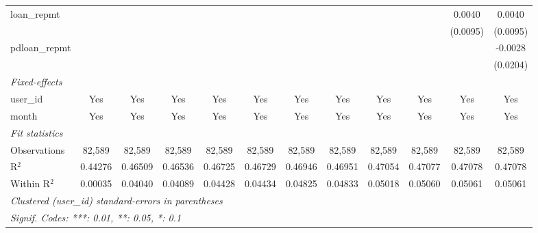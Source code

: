 \begin{table}[htbp]
\begin{tiny}
\begin{tabular}{lccccccccccc}
         loan\_repmt           &                &                &                &                &                &                &                &                 &                 & 0.0040          & 0.0040\\
                                &                &                &                &                &                &                &                &                 &                 & (0.0095)        & (0.0095)\\
         pdloan\_repmt         &                &                &                &                &                &                &                &                 &                 &                 & -0.0028\\
                                &                &                &                &                &                &                &                &                 &                 &                 & (0.0204)\\
         \midrule \emph{Fixed-effects} &   &   &   &   &   &   &   &   &   &   &  \\
         user\_id              & Yes            & Yes            & Yes            & Yes            & Yes            & Yes            & Yes            & Yes             & Yes             & Yes             & Yes\\
         month                  & Yes            & Yes            & Yes            & Yes            & Yes            & Yes            & Yes            & Yes             & Yes             & Yes             & Yes\\
         \midrule \emph{Fit statistics} &   &   &   &   &   &   &   &   &   &   &  \\
         Observations           & 82,589         & 82,589         & 82,589         & 82,589         & 82,589         & 82,589         & 82,589         & 82,589          & 82,589          & 82,589          & 82,589\\
         R$^2$                  & 0.44276        & 0.46509        & 0.46536        & 0.46725        & 0.46729        & 0.46946        & 0.46951        & 0.47054         & 0.47077         & 0.47078         & 0.47078\\
         Within R$^2$           & 0.00035        & 0.04040        & 0.04089        & 0.04428        & 0.04434        & 0.04825        & 0.04833        & 0.05018         & 0.05060         & 0.05061         & 0.05061\\
         \midrule\midrule\multicolumn{12}{l}{\emph{Clustered (user\_id) standard-errors in parentheses}}\\
         \multicolumn{12}{l}{\emph{Signif. Codes: ***: 0.01, **: 0.05, *: 0.1}}\\
      \end{tabular}
   \end{tiny}
\end{table}


